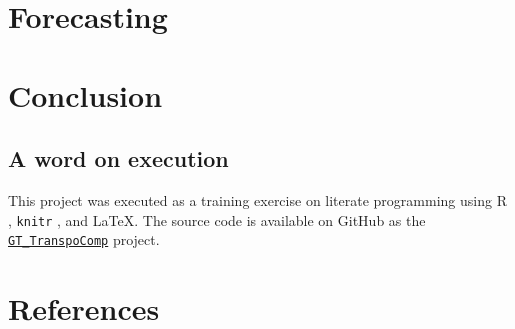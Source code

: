 \documentclass[review, authoryear]{elsarticle}\usepackage{graphicx, color}
\begin{document}
\section{Forecasting}


\section{Conclusion}

\subsection*{A word on execution}
This project was executed as a training exercise on literate programming using 
R \citep{R}, \texttt{knitr} \citep{knitr}, and \LaTeX. The source code is available
on GitHub as the 
\href{https://github.com/gregmacfarlane/GT_TranspoComp}{\texttt{GT\_TranspoComp}}
project.


\section*{References}


\end{document}
